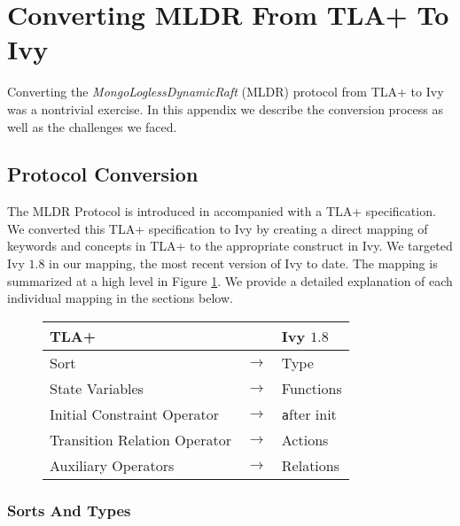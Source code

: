\documentclass[12pt]{article}
\newcommand{\tla}[1]{{\small\scshape #1}}
\newcommand{\ivy}[1]{{\footnotesize\texttt #1}}
\begin{document}



\section{Converting MLDR From TLA+ To Ivy}

Converting the \textit{MongoLoglessDynamicRaft} (MLDR) protocol from TLA+ to Ivy was a nontrivial exercise.  In this appendix we describe the conversion process as well as the challenges we faced.

\subsection{Protocol Conversion}

The MLDR Protocol is introduced in \cite{schultz2021design} accompanied with a TLA+ specification.  We converted this TLA+ specification to Ivy by creating a direct mapping of keywords and concepts in TLA+ to the appropriate construct in Ivy.  We targeted Ivy $1.8$ in our mapping, the most recent version of Ivy to date.  The mapping is summarized at a high level in Figure \ref{fig:conv-map}.  We provide a detailed explanation of each individual mapping in the sections below.

\begin{figure}
  \label{fig:conv-map}
  \begin{center}
  \begin{tabular}{lcl}
    TLA+& & Ivy $1.8$\\
    \hline
    Sort& $\to$& Type\\
    State Variables& $\to$& Functions\\
    Initial Constraint Operator& $\to$& \ivy{after init}\\
    Transition Relation Operator& $\to$& Actions\\
    Auxiliary Operators& $\to$& Relations\\
  \end{tabular}
  \end{center}
\end{figure}

\subsubsection{Sorts And Types}
\end{document}
